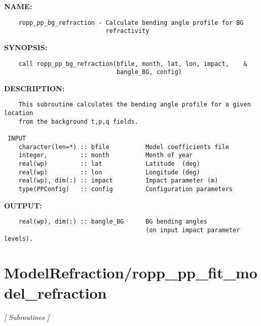 \label{ch:robo35}
\label{ch:ModelRefraction_ropp_pp_bg_refraction}
\textbf{NAME:}\hspace{0.08in}\begin{Verbatim}
    ropp_pp_bg_refraction - Calculate bending angle profile for BG 
                            refractivity
\end{Verbatim}
\textbf{SYNOPSIS:}\hspace{0.08in}\begin{Verbatim}
    call ropp_pp_bg_refraction(bfile, month, lat, lon, impact,    &
                               bangle_BG, config)
\end{Verbatim}
\textbf{DESCRIPTION:}\hspace{0.08in}\begin{Verbatim}
    This subroutine calculates the bending angle profile for a given location
    from the background t,p,q fields.

 INPUT
    character(len=*) :: bfile          Model coefficients file
    integer,         :: month          Month of year
    real(wp)         :: lat            Latitude  (deg)
    real(wp)         :: lon            Longitude (deg)
    real(wp), dim(:) :: impact         Impact parameter (m)
    type(PPConfig)   :: config         Configuration parameters
\end{Verbatim}
\textbf{OUTPUT:}\hspace{0.08in}\begin{Verbatim}
    real(wp), dim(:) :: bangle_BG      BG bending angles 
                                       (on input impact parameter levels).
\end{Verbatim}
\section{ModelRefraction/ropp\_pp\_fit\_model\_refraction}
\textsl{[ Subroutines ]}

